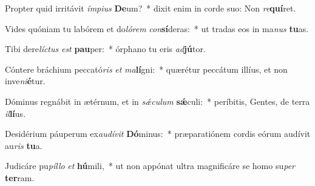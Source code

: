 \item Propter quid irritávit \textit{ím}\textit{pi}\textit{us} \textbf{De}um?~* dixit enim in corde suo: Non \textit{re}\textbf{quí}ret.
\item Vides quóniam tu labórem et do\textit{ló}\textit{rem} \textit{con}\textbf{sí}deras:~* ut tradas eos in ma\textit{nus} \textbf{tu}as.
\item Tibi dere\textit{líc}\textit{tus} \textit{est} \textbf{pau}per:~* órphano tu eris \textit{ad}\textbf{jú}tor.
\item Cóntere bráchium peccató\textit{ris} \textit{et} \textit{ma}\textbf{lí}gni:~* quærétur peccátum illíus, et non inve\textit{ni}\textbf{é}tur.
\item Dóminus regnábit in ætérnum, et in \textit{sǽ}\textit{cu}\textit{lum} \textbf{sǽ}culi:~* períbitis, Gentes, de terra \textit{il}\textbf{lí}us.
\item Desidérium páuperum ex\textit{au}\textit{dí}\textit{vit} \textbf{Dó}minus:~* præparatiónem cordis eórum audívit au\textit{ris} \textbf{tu}a.
\item Judicáre pu\textit{píl}\textit{lo} \textit{et} \textbf{hú}mili,~* ut non appónat ultra magnificáre se homo su\textit{per} \textbf{ter}ram.
